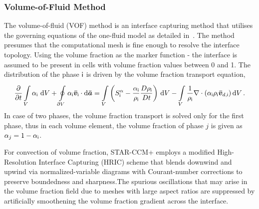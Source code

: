 \subsubsection{Volume-of-Fluid Method}
The volume-of-fluid (VOF) method is an interface capturing method that utilises the governing 
 equations of the one-fluid model as detailed in~. The method presumes that
 the computational mesh is fine enough to resolve the interface topology.
 Using the volume fraction as the marker function - the interface is assumed to be present
 in cells with volume fraction values between 0 and 1.
 The distribution of the phase \(\mathsf {i}\) is driven by the volume fraction transport equation,
\begin{equation}\label{eq_vof_transport}
\displaystyle\frac{\partial{}}{\partial{t}}\displaystyle\int\limits_{V}^{} \alpha_{\mathsf {i}}\,\mathop{}\!\mathrm{d}{V} +
\displaystyle\oint\limits_{\partial V}^{} \alpha_{\mathsf {i}} \bm{\bar{v}}_{\mathsf {i}} \cdot \mathop{}\!\mathrm{d}{\bm{\bar{a}}} = 
\displaystyle\int\limits_{V}^{} \left(S^{\alpha}_{\mathsf {i}} - \frac{\alpha_{\mathsf {i}}}{\rho_{\mathsf {i}}} \frac{D \rho_{\mathsf {i}}}{D t}\right)\,\mathop{}\!\mathrm{d}{V}
- \displaystyle\int\limits_{V}^{} \frac{1}{\rho_{\mathsf {i}}} \nabla \cdot \left(\alpha_{\mathsf {i}} \rho_{\mathsf {i}} \bm{\bar{v}}_{d,\mathsf {i}}\right)\mathop{}\!\mathrm{d}{V}\,.
\end{equation}
 In case of two phases, the volume fraction transport is solved only for the first phase, thus in each volume
 element, the volume fraction of phase \(j\) is given as \(\alpha_{j} = 1 - \alpha_{\mathsf {i}}\).
 
For convection of volume fraction, STAR-CCM+ employs a modified High-Resolution Interface 
Capturing (HRIC) scheme that blends downwind and
 upwind via normalized-variable 
diagrams with Courant-number corrections to preserve boundedness and sharpness.The spurious oscillations that may arise in the volume fraction field due to meshes with large aspect ratios
 are suppressed by artificially smoothening the volume fraction gradient across the interface.~\cite{star-ccm+}

